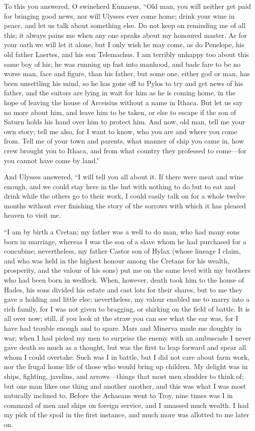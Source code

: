 To this you answered, O swineherd Eumaeus, “Old man, you will neither get paid
for bringing good news, nor will Ulysses ever come home; drink your wine in
peace, and let us talk about something else. Do not keep on reminding me of all
this; it always pains me when any one speaks about my honoured master. As for
your oath we will let it alone, but I only wish he may come, as do Penelope,
his old father Laertes, and his son Telemachus. I am terribly unhappy too about
this same boy of his; he was running up fast into manhood, and bade fare to be
no worse man, face and figure, than his father, but some one, either god or
man, has been unsettling his mind, so he has gone off to Pylos to try and get
news of his father, and the suitors are lying in wait for him as he is coming
home, in the hope of leaving the house of Arceisius without a name in Ithaca.
But let us say no more about him, and leave him to be taken, or else to escape
if the son of Saturn holds his hand over him to protect him. And now, old man,
tell me your own story; tell me also, for I want to know, who you are and where
you come from. Tell me of your town and parents, what manner of ship you came
in, how crew brought you to Ithaca, and from what country they professed to
come—for you cannot have come by land.”

And Ulysses answered, “I will tell you all about it. If there were meat and
wine enough, and we could stay here in the hut with nothing to do but to eat
and drink while the others go to their work, I could easily talk on for a whole
twelve months without ever finishing the story of the sorrows with which it has
pleased heaven to visit me.

“I am by birth a Cretan; my father was a well to do man, who had many sons born
in marriage, whereas I was the son of a slave whom he had purchased for a
concubine; nevertheless, my father Castor son of Hylax (whose lineage I claim,
and who was held in the highest honour among the Cretans for his wealth,
prosperity, and the valour of his sons) put me on the same level with my
brothers who had been born in wedlock. When, however, death took him to the
house of Hades, his sons divided his estate and cast lots for their shares, but
to me they gave a holding and little else; nevertheless, my valour enabled me
to marry into a rich family, for I was not given to bragging, or shirking on
the field of battle. It is all over now; still, if you look at the straw you
can see what the ear was, for I have had trouble enough and to spare. Mars and
Minerva made me doughty in war; when I had picked my men to surprise the enemy
with an ambuscade I never gave death so much as a thought, but was the first to
leap forward and spear all whom I could overtake. Such was I in battle, but I
did not care about farm work, nor the frugal home life of those who would bring
up children. My delight was in ships, fighting, javelins, and arrows—things
that most men shudder to think of; but one man likes one thing and another
another, and this was what I was most naturally inclined to. Before the
Achaeans went to Troy, nine times was I in command of men and ships on foreign
service, and I amassed much wealth. I had my pick of the spoil in the first
instance, and much more was allotted to me later on.

